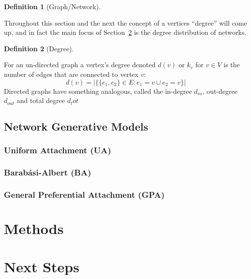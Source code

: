 \documentclass[
  10pt,
  a4paper,
]{scrreprt}
\theoremstyle{definition}
\newtheorem{definition}{Definition}[section]
\theoremstyle{plain}
\theoremstyle{remark}
\begin{document}
{\begin{definition}[Graph/Network]
\end{definition}

Throughout this section and the next the concept of a vertices
``degree'' will come up, and in fact the main focus of
Section~\ref{sec-meth} is the degree distribution of networks.

\begin{definition}[Degree]\protect\hypertarget{def-deg}{}\label{def-deg}

For an un-directed graph a vertex's degree denoted \(d(v)\) or \(k_v\)
for \(v\in V\) is the number of edges that are connected to vertex
\(v\): \[
d(v) = |\{\{e_1, e_2\}\in E : e_1=v \cup e_2=v\}|
\] Directed graphs have something analogous, called the in-degree
\(d_{in}\), out-degree \(d_{out}\) and total degree \(d_tot\)

\end{definition}

\hypertarget{network-generative-models}{%
\section{Network Generative Models}\label{network-generative-models}}

\hypertarget{uniform-attachment-ua}{%
\subsection{Uniform Attachment (UA)}\label{uniform-attachment-ua}}

\hypertarget{barabuxe1si-albert-ba}{%
\subsection{Barabási-Albert (BA)}\label{barabuxe1si-albert-ba}}

\hypertarget{general-preferential-attachment-gpa}{%
\subsection{General Preferential Attachment
(GPA)}\label{general-preferential-attachment-gpa}}

\hypertarget{sec-meth}{%
\chapter{Methods}\label{sec-meth}}

\hypertarget{next-steps}{%
\chapter{Next Steps}\label{next-steps}}

}
\end{document}
